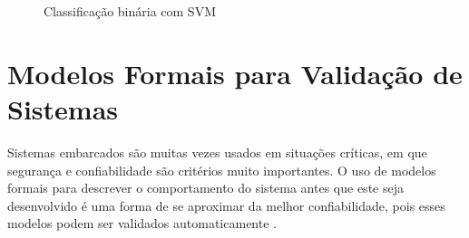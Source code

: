 \begin{figure}[h]
    \centering
    \caption{Classificação binária com SVM}
    \label{fig:svm_classification}
        \hspace{0.2cm}
\end{figure}


\section{Modelos Formais para Validação de Sistemas}
\label{sec:modelosformais}
Sistemas embarcados são muitas vezes usados em situações críticas, em que segurança e confiabilidade são critérios muito importantes. O uso de modelos formais para descrever o comportamento do sistema antes que este seja desenvolvido é uma forma de se aproximar da melhor confiabilidade, pois esses modelos podem ser validados automaticamente \cite{edwards:1997}.

